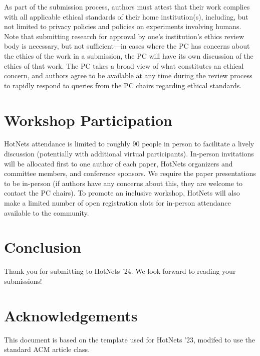 \documentclass[sigconf,10pt,anonymous,review,nonacm]{acmart}
\begin{document}
As part of the submission process, authors must attest that their work complies with all applicable ethical standards of their home institution(s), including, but not limited to privacy policies and policies on experiments involving humans. Note that submitting research for approval by one’s institution’s ethics review body is necessary, but not sufficient---in cases where the PC has concerns about the ethics of the work in a submission, the PC will have its own discussion of the ethics of that work. The PC takes a broad view of what constitutes an ethical concern, and authors agree to be available at any time during the review process to rapidly respond to queries from the PC chairs regarding ethical standards.

\section{Workshop Participation}

HotNets attendance is limited to roughly 90 people in person to facilitate a lively discussion (potentially with additional virtual participants). In-person invitations will be allocated first to one author of each paper, HotNets organizers and committee members, and conference sponsors. We require the paper presentations to be in-person (if authors have any concerns about this, they are welcome to contact the PC chairs). To promote an inclusive workshop, HotNets will also make a limited number of open registration slots for in-person attendance available to the community.

\section{Conclusion}

Thank you for submitting to HotNets '24. We look forward to reading your submissions!

\section*{Acknowledgements}

This document is based on the template used for HotNets '23, modifed to use the standard ACM article class.

 

\end{document}
